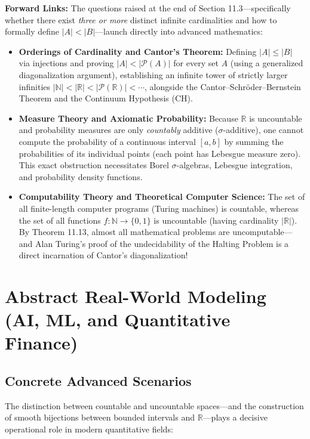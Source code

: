 \documentclass[11pt, letterpaper]{article}
\theoremstyle{definition}
\theoremstyle{remark}
\begin{document}
\textbf{Forward Links:} The questions raised at the end of Section 11.3—specifically whether there exist \emph{three or more} distinct infinite cardinalities and how to formally define $|A| < |B|$—launch directly into advanced mathematics:
\begin{itemize}
    \item \textbf{Orderings of Cardinality and Cantor's Theorem:} Defining $|A| \le |B|$ via injections and proving $|A| < |\mathcal{P}(A)|$ for every set $A$ (using a generalized diagonalization argument), establishing an infinite tower of strictly larger infinities $|\mathbb{N}| < |\mathbb{R}| < |\mathcal{P}(\mathbb{R})| < \cdots$, alongside the Cantor–Schr\"oder–Bernstein Theorem and the Continuum Hypothesis (CH).
    \item \textbf{Measure Theory and Axiomatic Probability:} Because $\mathbb{R}$ is uncountable and probability measures are only \emph{countably} additive ($\sigma$-additive), one cannot compute the probability of a continuous interval $[a, b]$ by summing the probabilities of its individual points (each point has Lebesgue measure zero). This exact obstruction necessitates Borel $\sigma$-algebras, Lebesgue integration, and probability density functions.
    \item \textbf{Computability Theory and Theoretical Computer Science:} The set of all finite-length computer programs (Turing machines) is countable, whereas the set of all functions $f : \mathbb{N} \to \{0, 1\}$ is uncountable (having cardinality $|\mathbb{R}|$). By Theorem 11.13, almost all mathematical problems are uncomputable—and Alan Turing's proof of the undecidability of the Halting Problem is a direct incarnation of Cantor's diagonalization!
\end{itemize}

\section{Abstract Real-World Modeling (AI, ML, and Quantitative Finance)}

\subsection{Concrete Advanced Scenarios}

The distinction between countable and uncountable spaces—and the construction of smooth bijections between bounded intervals and $\mathbb{R}$—plays a decisive operational role in modern quantitative fields:
\end{document}
